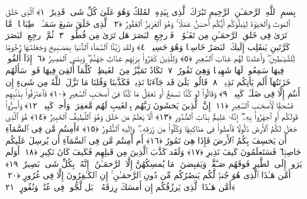 
  
    
  
    
    

\nopagebreak
  بِسمِ ٱللَّهِ ٱلرَّحمَـٰنِ ٱلرَّحِيمِ
  تَبَٰرَكَ ٱلَّذِى بِيَدِهِ ٱلمُلكُ وَهُوَ عَلَىٰ كُلِّ شَىءٍۢ قَدِيرٌ ﴿١﴾
 ٱلَّذِى خَلَقَ ٱلمَوتَ وَٱلحَيَوٰةَ لِيَبلُوَكُم أَيُّكُم أَحسَنُ عَمَلًۭا ۚ وَهُوَ ٱلعَزِيزُ ٱلغَفُورُ ﴿٢﴾
 ٱلَّذِى خَلَقَ سَبعَ سَمَـٰوَٟتٍۢ طِبَاقًۭا ۖ مَّا تَرَىٰ فِى خَلقِ ٱلرَّحمَـٰنِ مِن تَفَـٰوُتٍۢ ۖ فَٱرجِعِ ٱلبَصَرَ هَل تَرَىٰ مِن فُطُورٍۢ ﴿٣﴾
 ثُمَّ ٱرجِعِ ٱلبَصَرَ كَرَّتَينِ يَنقَلِب إِلَيكَ ٱلبَصَرُ خَاسِئًۭا وَهُوَ حَسِيرٌۭ ﴿٤﴾
 وَلَقَد زَيَّنَّا ٱلسَّمَآءَ ٱلدُّنيَا بِمَصَـٰبِيحَ وَجَعَلنَـٰهَا رُجُومًۭا لِّلشَّيَـٰطِينِ ۖ وَأَعتَدنَا لَهُم عَذَابَ ٱلسَّعِيرِ ﴿٥﴾
 وَلِلَّذِينَ كَفَرُوا۟ بِرَبِّهِم عَذَابُ جَهَنَّمَ ۖ وَبِئسَ ٱلمَصِيرُ ﴿٦﴾
 إِذَآ أُلقُوا۟ فِيهَا سَمِعُوا۟ لَهَا شَهِيقًۭا وَهِىَ تَفُورُ ﴿٧﴾
 تَكَادُ تَمَيَّزُ مِنَ ٱلغَيظِ ۖ كُلَّمَآ أُلقِىَ فِيهَا فَوجٌۭ سَأَلَهُم خَزَنَتُهَآ أَلَم يَأتِكُم نَذِيرٌۭ ﴿٨﴾
 قَالُوا۟ بَلَىٰ قَد جَآءَنَا نَذِيرٌۭ فَكَذَّبنَا وَقُلنَا مَا نَزَّلَ ٱللَّهُ مِن شَىءٍ إِن أَنتُم إِلَّا فِى ضَلَـٰلٍۢ كَبِيرٍۢ ﴿٩﴾
 وَقَالُوا۟ لَو كُنَّا نَسمَعُ أَو نَعقِلُ مَا كُنَّا فِىٓ أَصحَـٰبِ ٱلسَّعِيرِ ﴿١٠﴾
 فَٱعتَرَفُوا۟ بِذَنۢبِهِم فَسُحقًۭا لِّأَصحَـٰبِ ٱلسَّعِيرِ ﴿١١﴾
 إِنَّ ٱلَّذِينَ يَخشَونَ رَبَّهُم بِٱلغَيبِ لَهُم مَّغفِرَةٌۭ وَأَجرٌۭ كَبِيرٌۭ ﴿١٢﴾
 وَأَسِرُّوا۟ قَولَكُم أَوِ ٱجهَرُوا۟ بِهِۦٓ ۖ إِنَّهُۥ عَلِيمٌۢ بِذَاتِ ٱلصُّدُورِ ﴿١٣﴾
 أَلَا يَعلَمُ مَن خَلَقَ وَهُوَ ٱللَّطِيفُ ٱلخَبِيرُ ﴿١٤﴾
 هُوَ ٱلَّذِى جَعَلَ لَكُمُ ٱلأَرضَ ذَلُولًۭا فَٱمشُوا۟ فِى مَنَاكِبِهَا وَكُلُوا۟ مِن رِّزقِهِۦ ۖ وَإِلَيهِ ٱلنُّشُورُ ﴿١٥﴾
 ءَأَمِنتُم مَّن فِى ٱلسَّمَآءِ أَن يَخسِفَ بِكُمُ ٱلأَرضَ فَإِذَا هِىَ تَمُورُ ﴿١٦﴾
 أَم أَمِنتُم مَّن فِى ٱلسَّمَآءِ أَن يُرسِلَ عَلَيكُم حَاصِبًۭا ۖ فَسَتَعلَمُونَ كَيفَ نَذِيرِ ﴿١٧﴾
 وَلَقَد كَذَّبَ ٱلَّذِينَ مِن قَبلِهِم فَكَيفَ كَانَ نَكِيرِ ﴿١٨﴾
 أَوَلَم يَرَوا۟ إِلَى ٱلطَّيرِ فَوقَهُم صَـٰٓفَّٰتٍۢ وَيَقبِضنَ ۚ مَا يُمسِكُهُنَّ إِلَّا ٱلرَّحمَـٰنُ ۚ إِنَّهُۥ بِكُلِّ شَىءٍۭ بَصِيرٌ ﴿١٩﴾
 أَمَّن هَـٰذَا ٱلَّذِى هُوَ جُندٌۭ لَّكُم يَنصُرُكُم مِّن دُونِ ٱلرَّحمَـٰنِ ۚ إِنِ ٱلكَـٰفِرُونَ إِلَّا فِى غُرُورٍ ﴿٢٠﴾
 أَمَّن هَـٰذَا ٱلَّذِى يَرزُقُكُم إِن أَمسَكَ رِزقَهُۥ ۚ بَل لَّجُّوا۟ فِى عُتُوٍّۢ وَنُفُورٍ ﴿٢١﴾

